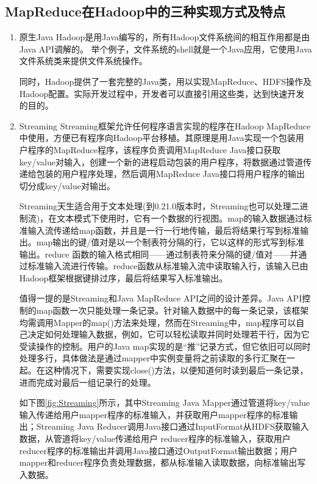 \subsection{MapReduce在Hadoop中的三种实现方式及特点}
\begin{enumerate}
\item 原生Java
Hadoop是用Java编写的，所有Hadoop文件系统间的相互作用都是由Java API调解的。 举个例子，文件系统的shell就是一个Java应用，它使用Java文件系统类来提供文件系统操作。

同时，Hadoop提供了一套完整的Java类，用以实现MapReduce、HDFS操作及Hadoop配置。实际开发过程中，开发者可以直接引用这些类，达到快速开发的目的。

\item Streaming
Streaming框架允许任何程序语言实现的程序在Hadoop MapReduce中使用，方便已有程序向Hadoop平台移植。其原理是用Java实现一个包装用户程序的MapReduce程序，该程序负责调用MapReduce Java接口获取key/value对输入，创建一个新的进程启动包装的用户程序，将数据通过管道传递给包装的用户程序处理，然后调用MapReduce Java接口将用户程序的输出切分成key/value对输出。

Streaming天生适合用于文本处理(到0.21.0版本时，Streaming也可以处理二进制流)，在文本模式下使用时，它有一个数据的行视图。map的输入数据通过标准输入流传递给map函数，并且是一行一行地传输，最后将结果行写到标准输出。map输出的键/值对是以一个制表符分隔的行，它以这样的形式写到标准输出。reduce 函数的输入格式相同——通过制表符来分隔的键/值对——并通过标准输入流进行传输。reduce函数从标准输入流中读取输入行，该输入已由Hadoop框架根据键排过序，最后将结果写入标准输出。

值得一提的是Streaming和Java MapReduce API之间的设计差异。Java API控制的map函数一次只能处理一条记录。针对输入数据中的每一条记录，该框架均需调用Mapper的map()方法来处理，然而在Streaming中，map程序可以自己决定如何处理输入数据，例如，它可以轻松读取并同时处理若干行，因为它受读操作的控制。用户的Java map实现的是“推”记录方式，但它依旧可以同时处理多行，具体做法是通过mapper中实例变量将之前读取的多行汇聚在一起。在这种情况下，需要实现close()方法，以便知道何时读到最后一条记录，进而完成对最后一组记录行的处理。

如下图\ref{fig:Streaming}所示，其中Streaming Java Mapper通过管道将key/value输入传递给用户mapper程序的标准输入，并获取用户mapper程序的标准输出；Streaming Java Reducer调用Java接口通过InputFormat从HDFS获取输入数据，从管道将key/value传递给用户 reducer程序的标准输入，获取用户reducer程序的标准输出并调用Java接口通过OutputFormat输出数据；用户mapper和reducer程序负责处理数据，都从标准输入读取数据，向标准输出写入数据。



\end{enumerate}
